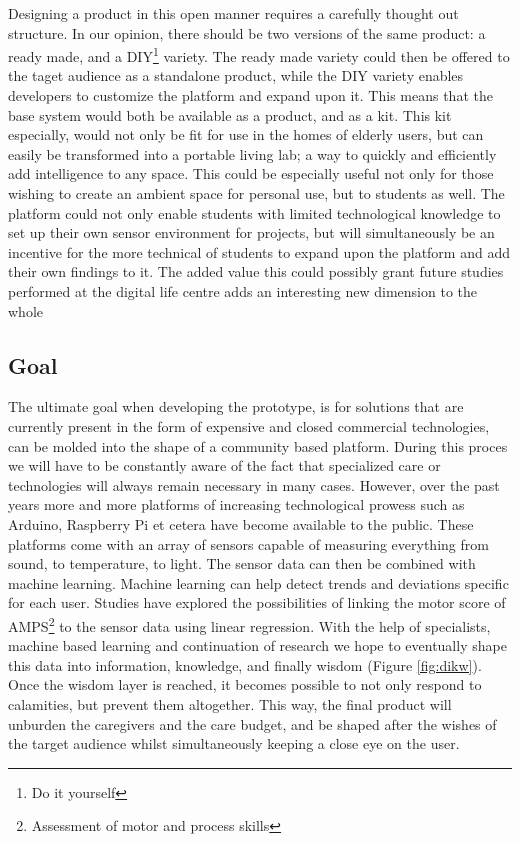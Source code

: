\documentclass{below-ext}
\begin{document}
Designing a product in this open manner requires a carefully thought out structure. In our opinion, there should be two versions of the same product: a ready made, and a DIY\footnote{Do it yourself} variety. The ready made variety could then be offered to the taget audience as a standalone product, while the DIY variety enables developers to customize the platform and expand upon it. This means that the base system would both be available as a product, and as a kit. This kit especially, would not only be fit for use in the homes of elderly users, but can easily be transformed into a portable living lab; a way to quickly and efficiently add intelligence to any space. This could be especially useful not only for those wishing to create an ambient space for personal use, but to students as well. The platform could not only enable students with limited technological knowledge to set up their own sensor environment for projects, but will simultaneously be an incentive for the more technical of students to expand upon the platform and add their own findings to it.  The added value this could possibly grant future studies performed at the digital life centre adds an interesting new dimension to the whole


\subsection{Goal}

The ultimate goal when developing the prototype, is for solutions that are currently present in the form of expensive and closed commercial technologies, can be molded into the shape of a community based platform. During this proces we will have to be constantly aware of the fact that specialized care or technologies will always remain necessary in many cases. However, over the past years more and more platforms of increasing technological prowess such as Arduino, Raspberry Pi et cetera have become available to the public. These platforms come with an array of sensors capable of measuring everything from sound, to temperature, to light. The sensor data can then be combined with machine learning. Machine learning can help detect trends and deviations specific for each user. Studies have explored the possibilities of linking the motor score of AMPS\footnote{Assessment of motor and process skills} to the sensor data using linear regression\cite{robben2012grandma}. With the help of specialists, machine based learning and continuation of research we hope to eventually shape this data into information, knowledge, and finally wisdom (Figure \ref{fig:dikw}). Once the wisdom layer is reached, it becomes possible to not only respond to calamities, but prevent them altogether.\cite{rowley2007wisdom} This way, the final product will unburden the caregivers and the care budget, and  be shaped after the wishes of the target audience  whilst simultaneously keeping a close eye on the user.
\end{document}
